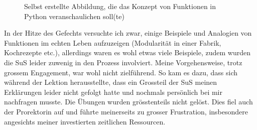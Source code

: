 \begin{myExBox}[title=Beispiel aus der eigenen Unterrichtserfahrung]
\begin{figure}[H]
\centering
{}
\caption*{Selbst erstellte Abbildung, die das Konzept von Funktionen in Python veranschaulichen soll(te)}
\end{figure}
In der Hitze des Gefechts versuchte ich zwar, einige Beispiele und Analogien von Funktionen im echten Leben aufzuzeigen (Modularität in einer Fabrik, Kochrezepte etc.), allerdings waren es wohl etwas viele Beispiele, zudem wurden die SuS leider zuwenig in den Prozess involviert. Meine Vorgehensweise, trotz grossem Engagement, war wohl nicht zielführend. So kam es dazu, dass sich während der Lektion herausstellte, dass ein Grossteil der SuS meinen Erklärungen leider nicht gefolgt hatte und nochmals persönlich bei mir nachfragen musste. Die Übungen wurden grösstenteils nicht gelöst. Dies fiel auch der Prorektorin auf und führte meinerseits zu grosser Frustration, insbesondere angesichts meiner investierten zeitlichen Ressourcen.

\end{myExBox}
\newpage

